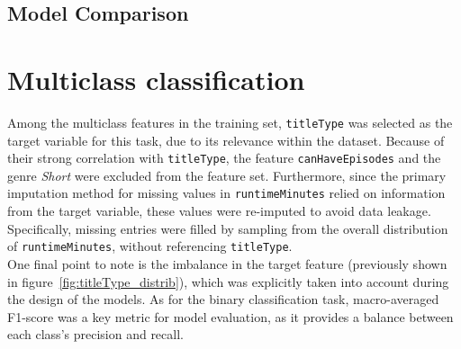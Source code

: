 \subsection{Model Comparison}

\section{Multiclass classification}\label{sec:multiclass_classification}
Among the multiclass features in the training set, \texttt{titleType} was selected as the target variable
for this task, due to its relevance within the dataset. Because of their strong correlation with
\texttt{titleType}, the feature \texttt{canHaveEpisodes} and the genre \textit{Short} were excluded from the
feature set. Furthermore, since the primary imputation method for missing values in \texttt{runtimeMinutes}
relied on information from the target variable, these values were re-imputed to avoid data leakage.
Specifically, missing entries were filled by sampling from the overall distribution of
\texttt{runtimeMinutes}, without referencing \texttt{titleType}.\\

One final point to note is the imbalance in the target feature (previously shown in
figure~\ref{fig:titleType_distrib}), which was explicitly taken into account
during the design of the models. As for the binary classification task, macro-averaged F1-score was
a key metric for model evaluation, as it provides a balance between each class's precision and recall.



